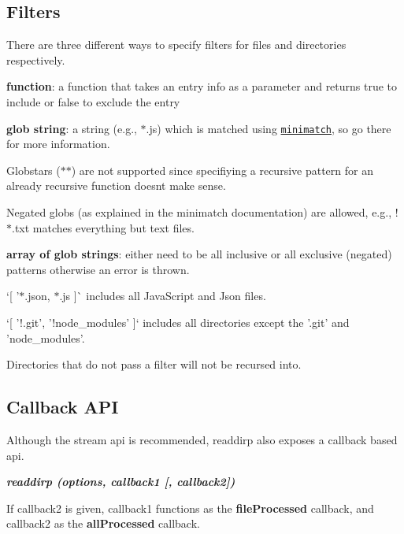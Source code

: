 \subsection*{Filters}

There are three different ways to specify filters for files and directories respectively.


\begin{DoxyItemize}
\item {\bfseries function}\+: a function that takes an entry info as a parameter and returns true to include or false to exclude the entry
\item {\bfseries glob string}\+: a string (e.\+g., {\ttfamily $\ast$.js}) which is matched using \href{https://github.com/isaacs/minimatch}{\tt minimatch}, so go there for more information.

Globstars ({\ttfamily $\ast$$\ast$}) are not supported since specifiying a recursive pattern for an already recursive function doesn\textquotesingle{}t make sense.

Negated globs (as explained in the minimatch documentation) are allowed, e.\+g., {\ttfamily !$\ast$.txt} matches everything but text files.
\item {\bfseries array of glob strings}\+: either need to be all inclusive or all exclusive (negated) patterns otherwise an error is thrown.

`\mbox{[} '$\ast$.json\textquotesingle{}, \textquotesingle{}$\ast$.js\textquotesingle{} \mbox{]}\`{} includes all Java\+Script and Json files.
\end{DoxyItemize}

\begin{DoxyVerb}`[ '!.git', '!node_modules' ]` includes all directories except the '.git' and 'node_modules'.
\end{DoxyVerb}


Directories that do not pass a filter will not be recursed into.

\subsection*{Callback A\+PI}

Although the stream api is recommended, readdirp also exposes a callback based api.

{\itshape {\bfseries readdirp (options, callback1 \mbox{[}, callback2\mbox{]})}}

If callback2 is given, callback1 functions as the {\bfseries file\+Processed} callback, and callback2 as the {\bfseries all\+Processed} callback.

